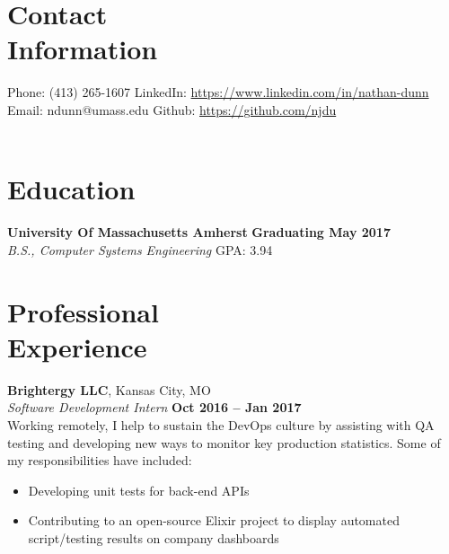 \documentclass[margin,line]{resume}
\begin{document}
\begin{resume}
    \section{\mysidestyle Contact\\Information}

    Phone: (413) 265-1607 \tabto{5cm} LinkedIn: \url{https://www.linkedin.com/in/nathan-dunn}\\
    Email: ndunn@umass.edu \tabto{5cm}  Github: \url{https://github.com/njdu}\\
    \vspace{0mm}\\\vspace{-1cm}

    \section{\mysidestyle Education}

    \textbf{University Of Massachusetts Amherst} \hfill \textbf{Graduating May 2017}\\
    \textsl{B.S., Computer Systems Engineering} \hfill
    GPA: 3.94


    \section{\mysidestyle Professional\\Experience}

    \textbf{Brightergy LLC}, Kansas City, MO \vspace{2mm}\\\vspace{1mm}%
    \textsl{Software Development Intern} \hfill \textbf{Oct 2016 -- Jan 2017}\\
    Working remotely, I help to sustain the DevOps culture by assisting with QA testing and developing new ways to monitor key production statistics.  Some of my responsibilities have included:
    \begin{itemize}
        \item Developing unit tests for back-end APIs
        \item Contributing to an open-source Elixir project to display automated script/testing results on company dashboards
    \end{itemize}


\end{resume}
\end{document}

